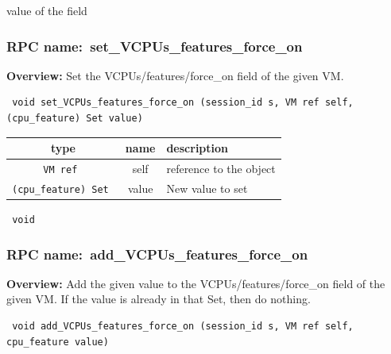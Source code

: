 value of the field
\vspace{0.3cm}
\vspace{0.3cm}
\vspace{0.3cm}
\subsubsection{RPC name:~set\_VCPUs\_features\_force\_on}

{\bf Overview:} 
Set the VCPUs/features/force\_on field of the given VM.

\begin{verbatim} void set_VCPUs_features_force_on (session_id s, VM ref self, (cpu_feature) Set value)\end{verbatim}



 
\vspace{0.3cm}
\begin{tabular}{|c|c|p{7cm}|}
 \hline
{\bf type} & {\bf name} & {\bf description} \\ \hline
{\tt VM ref } & self & reference to the object \\ \hline 

{\tt (cpu\_feature) Set } & value & New value to set \\ \hline 

\end{tabular}

\vspace{0.3cm}

{\tt 
void
}



\vspace{0.3cm}
\vspace{0.3cm}
\vspace{0.3cm}
\subsubsection{RPC name:~add\_VCPUs\_features\_force\_on}

{\bf Overview:} 
Add the given value to the VCPUs/features/force\_on field of the given VM.  If the value is already in that Set, then do nothing.

\begin{verbatim} void add_VCPUs_features_force_on (session_id s, VM ref self, cpu_feature value)\end{verbatim}



